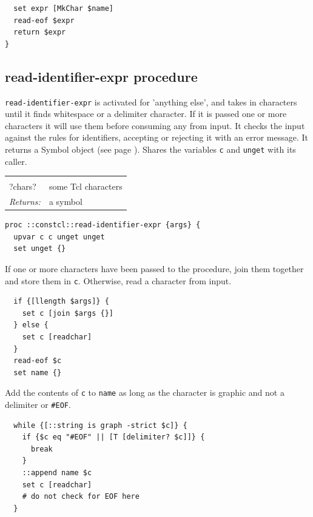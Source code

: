\documentclass[a5paper,draft]{memoir}
\begin{document}
\begin{lstlisting}
  set expr [MkChar $name]
  read-eof $expr
  return $expr
}
\end{lstlisting}

\subsection{read-identifier-expr procedure}
\label{readidentifierexpr-procedure}

\texttt{read-identifier-expr} is activated for 'anything else', and takes in characters until it finds whitespace or a delimiter character. If it is passed one or more characters it will use them before consuming any from input. It checks the input against the rules for identifiers, accepting or rejecting it with an error message. It returns a Symbol object (see page \pageref{symbols}). Shares the variables \texttt{c} and \texttt{unget} with its caller.

\noindent\begin{tabular}{ |p{1.9cm} p{6.5cm}| }
\hline
\rowcolor[HTML]{CCCCCC} \multicolumn{2}{|l|}{\textbf{read-identifier-expr (internal)}} \\
?chars? & some Tcl characters \\
\textit{Returns:} & a symbol \\
\hline
\end{tabular}

\begin{lstlisting}
proc ::constcl::read-identifier-expr {args} {
  upvar c c unget unget
  set unget {}
\end{lstlisting}

If one or more characters have been passed to the procedure, join them together and store them in \texttt{c}. Otherwise, read a character from input.

\begin{lstlisting}
  if {[llength $args]} {
    set c [join $args {}]
  } else {
    set c [readchar]
  }
  read-eof $c
  set name {}
\end{lstlisting}

Add the contents of \texttt{c} to \texttt{name} as long as the character is graphic and not a delimiter or \texttt{\#EOF}.

\begin{lstlisting}
  while {[::string is graph -strict $c]} {
    if {$c eq "#EOF" || [T [delimiter? $c]]} {
      break
    }
    ::append name $c
    set c [readchar]
    # do not check for EOF here
  }
\end{lstlisting}
\end{document}

